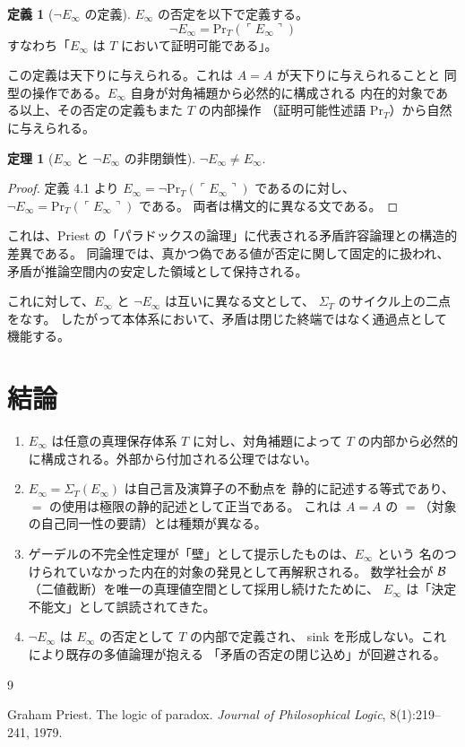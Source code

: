 \documentclass[11pt,a4paper]{article}
\theoremstyle{definition}
\newtheorem{definition}{定義}[section]
\newtheorem{theorem}{定理}[section]
\newcommand{\Einfty}{E_\infty}
\newcommand{\SelfRef}{\Sigma}
\renewcommand{\Pr}{\mathrm{Pr}}
\begin{document}
\begin{definition}[$\neg \Einfty$ の定義]
$\Einfty$ の否定を以下で定義する。
$$\neg \Einfty = \Pr_T(\ulcorner \Einfty \urcorner)$$
すなわち「$\Einfty$ は $T$ において証明可能である」。

この定義は天下りに与えられる。これは $A = A$ が天下りに与えられることと
同型の操作である。$\Einfty$ 自身が対角補題から必然的に構成される
内在的対象である以上、その否定の定義もまた $T$ の内部操作
（証明可能性述語 $\Pr_T$）から自然に与えられる。
\end{definition}

\begin{theorem}[$\Einfty$ と $\neg \Einfty$ の非閉鎖性]
$\neg \Einfty \neq \Einfty$.
\end{theorem}

\begin{proof}
定義 4.1 より $\Einfty = \neg \Pr_T(\ulcorner \Einfty \urcorner)$ であるのに対し、
$\neg \Einfty = \Pr_T(\ulcorner \Einfty \urcorner)$ である。
両者は構文的に異なる文である。
\end{proof}

これは、Priest の「パラドックスの論理」に代表される矛盾許容論理との構造的差異である\cite{Priest1979}。
同論理では、真かつ偽である値が否定に関して固定的に扱われ、
矛盾が推論空間内の安定した領域として保持される。

これに対して、$\Einfty$ と $\neg \Einfty$ は互いに異なる文として、
$\SelfRef_T$ のサイクル上の二点をなす。
したがって本体系において、矛盾は閉じた終端ではなく通過点として機能する。

\section{結論}

\begin{enumerate}[label=(\arabic*)]
    \item $\Einfty$ は任意の真理保存体系 $T$ に対し、対角補題によって
          $T$ の内部から必然的に構成される。外部から付加される公理ではない。
    \item $\Einfty = \SelfRef_T(\Einfty)$ は自己言及演算子の不動点を
          静的に記述する等式であり、$=$ の使用は極限の静的記述として正当である。
          これは $A = A$ の $=$（対象の自己同一性の要請）とは種類が異なる。
    \item ゲーデルの不完全性定理が「壁」として提示したものは、$\Einfty$ という
          名のつけられていなかった内在的対象の発見として再解釈される。
          数学社会が $\mathcal{B}$（二値截断）を唯一の真理値空間として採用し続けたために、
          $\Einfty$ は「決定不能文」として誤読されてきた。
    \item $\neg \Einfty$ は $\Einfty$ の否定として $T$ の内部で定義され、
          sink を形成しない。これにより既存の多値論理が抱える
          「矛盾の否定の閉じ込め」が回避される。
\end{enumerate}


\begin{thebibliography}{9}

Graham Priest.
\newblock The logic of paradox.
\newblock \emph{Journal of Philosophical Logic}, 8(1):219--241, 1979.

\end{thebibliography}
\end{document}
